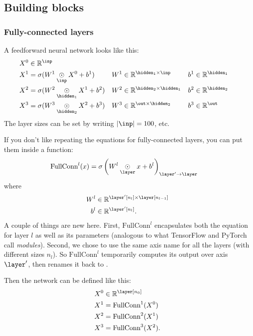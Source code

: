 \documentclass{article}
\begin{document}
\subsection{Building blocks}

\subsubsection{Fully-connected layers}

A feedforward neural network looks like this:
\begin{align*}
  X^0 &\in \mathbb{R}^{\inp} \\
  X^1 &= \sigma(W^1 \ndot{\inp} X^0 + b^1) & W^1 &\in \mathbb{R}^{\hidden_1 \times \inp} & b^1 &\in \mathbb{R}^{\hidden_1} \\
  X^2 &= \sigma(W^2 \ndot{\hidden_1} X^1 + b^2) & W^2 &\in \mathbb{R}^{\hidden_2 \times \hidden_1} & b^2 &\in \mathbb{R}^{\hidden_2} \\
  X^3 &= \sigma(W^3 \ndot{\hidden_2} X^2 + b^3) & W^3 &\in \mathbb{R}^{\out \times \hidden_2} & b^3 &\in \mathbb{R}^{\out}
\end{align*}
The layer sizes can be set by writing $|\inp| = 100$, etc.

If you don't like repeating the equations for fully-connected layers, you can put them inside a function:
\begin{align*}
  \text{FullConn}^l(x) &= \sigma\left(W^l \ndot{\layer} x + b^l\right)_{\layer'\rightarrow\layer}
\end{align*}
where
\begin{align*}
  W^l &\in \mathbb{R}^{\layer'[n_l] \times \layer[n_{l-1}]} \\
  b^l &\in \mathbb{R}^{\layer'[n_l]}.
\end{align*}
A couple of things are new here. First, $\text{FullConn}^l$ encapsulates both the equation for layer $l$ as well as its parameters (analogous to what TensorFlow and PyTorch call \emph{modules}). Second, we chose to use the same axis name \layer{} for all the layers (with different sizes $n_l$). So $\text{FullConn}^l$ temporarily computes its output over axis $\layer'$, then renames it back to \layer. 

Then the network can be defined like this:
\begin{align*}
  X^0 &\in \mathbb{R}^{\layer[n_0]} \\
  X^1 &= \text{FullConn}^1(X^0) \\
  X^2 &= \text{FullConn}^2(X^1) \\
  X^3 &= \text{FullConn}^3(X^2).
\end{align*}
\end{document}
